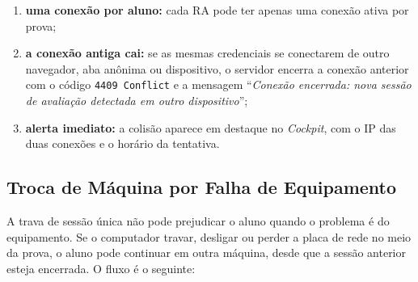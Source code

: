 \begin{enumerate}
    \item \textbf{uma conexão por aluno:} cada RA pode ter apenas uma conexão ativa por prova;
    \item \textbf{a conexão antiga cai:} se as mesmas credenciais se conectarem de outro navegador, aba anônima ou dispositivo, o servidor encerra a conexão anterior com o código \texttt{4409 Conflict} e a mensagem ``\textit{Conexão encerrada: nova sessão de avaliação detectada em outro dispositivo}'';
    \item \textbf{alerta imediato:} a colisão aparece em destaque no \textit{Cockpit}, com o IP das duas conexões e o horário da tentativa.
\end{enumerate}

\subsection{Troca de Máquina por Falha de Equipamento}
\label{sec:troca-maquina}

A trava de sessão única não pode prejudicar o aluno quando o problema é do equipamento. Se o computador travar, desligar ou perder a placa de rede no meio da prova, o aluno pode continuar em outra máquina, desde que a sessão anterior esteja encerrada. O fluxo é o seguinte:

